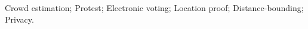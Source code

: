 \begin{abstract}
\end{abstract}

\begin{IEEEkeywords}
   Crowd estimation;
   Protest;
   Electronic voting;
   Location proof;
   Distance-bounding;
   Privacy.
\end{IEEEkeywords}

